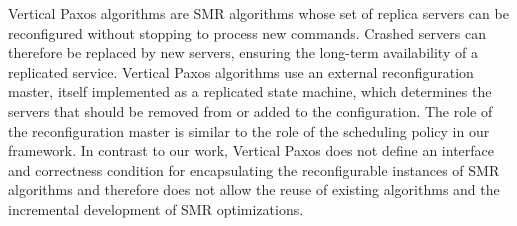 Vertical Paxos algorithms are SMR algorithms whose set of replica servers can
be reconfigured without stopping to process new commands. Crashed servers can
therefore be replaced by new servers, ensuring the long-term availability of a
replicated service. Vertical Paxos algorithms use an external reconfiguration
master, itself implemented as a replicated state machine, which determines
the servers that should be removed from or added to the configuration. The
role of the reconfiguration master is similar to the role of the scheduling
policy in our framework. In contrast to our work, Vertical Paxos does not define
an interface and correctness condition for encapsulating the reconfigurable
instances of SMR algorithms and therefore does not allow the reuse of existing
algorithms and the incremental development of SMR optimizations.


